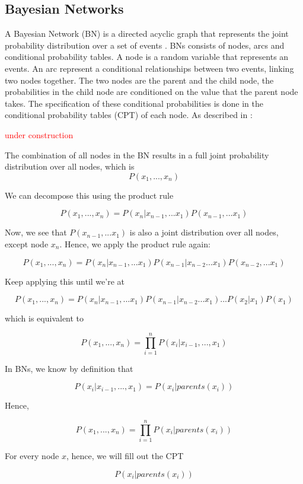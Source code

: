 \documentclass[12pt]{article}
\begin{document}
\subsection{Bayesian Networks}

A Bayesian Network (BN) is a directed acyclic graph that represents the joint probability distribution over a set of events \citep{pearl1988b}. BNs consists of nodes, arcs and conditional probability tables. A node is a random variable that represents an events. An arc represent a conditional relationships between two events, linking two nodes together. The two nodes are the parent and the child node, the probabilities in the child node are conditioned on the value that the parent node takes. The specification of these conditional probabilities is done in the conditional probability tables (CPT) of each node. As described in \citep{russellNorvig2010}:

 \textcolor{red} {under construction}


The combination of all nodes in the BN results in a full joint probability distribution over all nodes, which is 
\[P(x_1, ..., x_n)\]

We can decompose this using the product rule

\[P(x_1, ..., x_n) =  P(x_n|x_{n-1},... x_1) P(x_{n-1},...x_1)\]

Now, we see that $P(x_{n-1},...x_1)$ is also a joint distribution over all nodes, except node $x_n$. Hence, we apply the product rule again:

\[P(x_1, ..., x_n) =  P(x_n|x_{n-1},... x_1) P(x_{n-1}| x_{n-2}...x_1) P(x_{n-2},...x_1)\]

Keep applying this until we're at

\[P(x_1, ..., x_n) =  P(x_n|x_{n-1},... x_1) P(x_{n-1}| x_{n-2}...x_1) ... P(x_2 | x_1)P(x_1)\]

which is equivalent to 

\[P(x_1, ..., x_n) =  \prod_{i=1}^n P(x_i | x_{i-1},..., x_1)\]

In BNs, we know by definition that  

\[ P(x_i | x_{i-1},..., x_1) = P(x_i | parents(x_i))\]

Hence,

\[P(x_1, ..., x_n) =  \prod_{i=1}^n P(x_i | parents(x_i))\]

For every node $x$, hence, we will fill out the CPT

\[P(x_i | parents(x_i))\]
\end{document}
